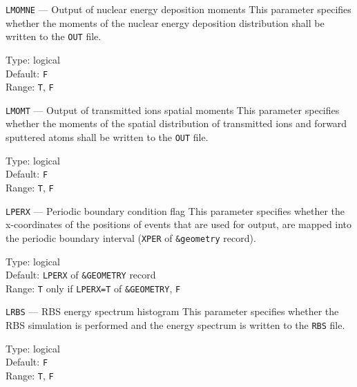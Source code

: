 \begin{keydescription}{\texttt{LMOMNE} --- Output of nuclear energy deposition moments}
%
  This parameter specifies whether the moments of the nuclear energy deposition distribution 
  shall be written to the \texttt{OUT} file.
  \begin{keytab}
    Type:    \> logical \\
    Default: \> \texttt{F} \\
    Range:   \> \texttt{T}, \texttt{F} 
  \end{keytab}
\end{keydescription}

\begin{keydescription}{\texttt{LMOMT} --- Output of transmitted ions spatial moments}
%
  This parameter specifies whether the moments of the spatial distribution 
  of transmitted ions and forward sputtered atoms shall be written to the \texttt{OUT} file.
  \begin{keytab}
    Type:    \> logical \\
    Default: \> \texttt{F} \\
    Range:   \> \texttt{T}, \texttt{F} 
  \end{keytab}
\end{keydescription}

\begin{keydescription}{\texttt{LPERX} --- Periodic boundary condition flag}
%
  This parameter specifies whether the x-coordinates of the positions of events that are used 
  for output, are mapped into the periodic boundary interval (\texttt{XPER} of 
  \texttt{\&geometry} record).
  \begin{keytab}
    Type:    \> logical \\
    Default: \> \texttt{LPERX} of \texttt{\&GEOMETRY} record \\
    Range:   \> \texttt{T} only if \texttt{LPERX=T} of \texttt{\&GEOMETRY}, \texttt{F} 
  \end{keytab}
\end{keydescription}

\begin{keydescription}{\texttt{LRBS} --- RBS energy spectrum histogram}
%
  This parameter specifies whether the RBS simulation is performed and the energy spectrum is 
  written to the \texttt{RBS} file.
  \begin{keytab}
    Type:    \> logical \\
    Default: \> \texttt{F} \\
    Range:   \> \texttt{T}, \texttt{F} 
  \end{keytab}
\end{keydescription}

